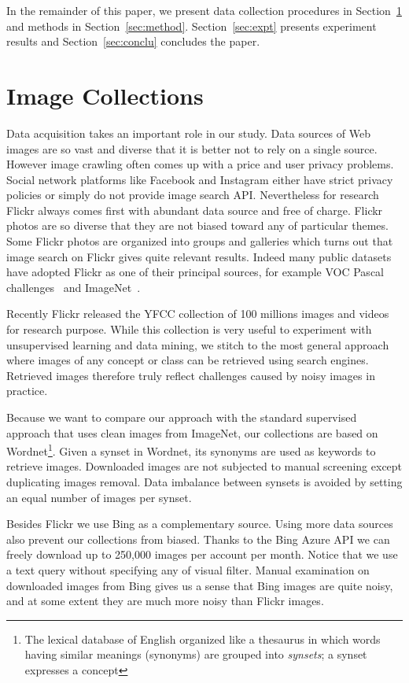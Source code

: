 \documentclass[preprint,12pt]{elsarticle}
\begin{document}
In the remainder of this paper, we present data collection procedures in Section~\ref{sec:datacollection} and methods in Section~\ref{sec:method}. Section~\ref{sec:expt} presents experiment results and Section~\ref{sec:conclu} concludes the paper.






\section{Image Collections}\label{sec:datacollection}
\noindent Data acquisition takes an important role in our study. Data sources of Web images are so vast and diverse that it is better not to rely on a single source. However image crawling often comes up with a price and user privacy problems. Social network platforms like Facebook and Instagram either have strict privacy policies or simply do not provide image search API. Nevertheless for research Flickr always comes first with abundant data source and free of charge. Flickr photos are so diverse that they are not biased toward any of particular themes. Some Flickr photos are organized into groups and galleries which turns out that image search on Flickr gives quite relevant results. Indeed many public datasets have adopted Flickr as one of their principal sources, for example VOC Pascal challenges~\cite{Everingham10} and ImageNet~\cite{ILSVRC15}. 

Recently Flickr released the YFCC collection of 100 millions images and videos for research purpose. While this collection is very useful to experiment with unsupervised learning and data mining, we stitch to the most general approach where images of any concept or class can be retrieved using search engines. Retrieved images therefore truly reflect challenges caused by noisy images in practice. 

Because we want to compare our approach with the standard supervised approach that uses clean images from ImageNet, our collections are based on Wordnet\footnote{The lexical database of English organized like a thesaurus in which words having similar meanings (synonyms) are grouped into \emph{synsets}; a synset expresses a concept}. Given a synset in Wordnet, its synonyms are used as keywords to retrieve images. Downloaded images are not subjected to manual screening except duplicating images removal. Data imbalance between synsets is avoided by setting an equal number of images per synset. 

Besides Flickr we use Bing as a  complementary source. Using more data sources also prevent our collections from  biased. Thanks to the Bing Azure API we can freely download up to 250,000 images per account per month. Notice that we use a text query without specifying any of visual filter. Manual examination on downloaded images from Bing gives us a sense that Bing images are quite noisy, and at some extent they are much more noisy than Flickr images.
\end{document}
